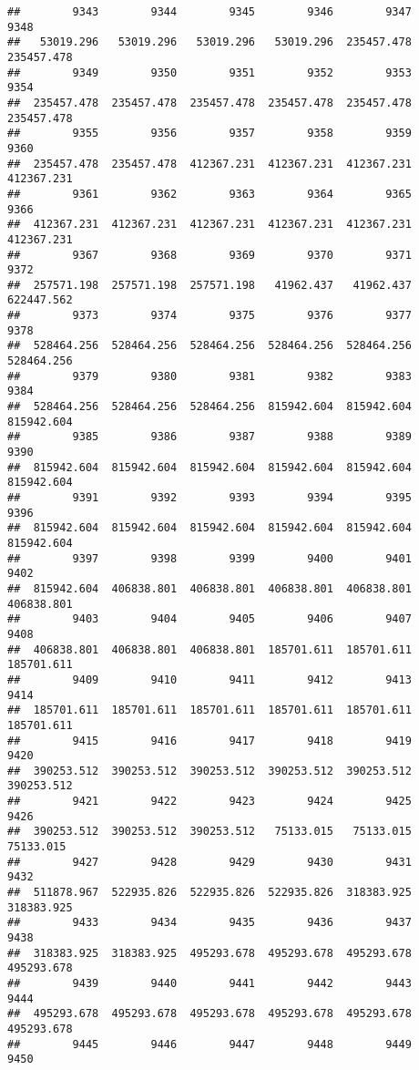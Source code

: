\documentclass[
]{book}
\begin{document}
\begin{verbatim}
##        9343        9344        9345        9346        9347        9348 
##   53019.296   53019.296   53019.296   53019.296  235457.478  235457.478 
##        9349        9350        9351        9352        9353        9354 
##  235457.478  235457.478  235457.478  235457.478  235457.478  235457.478 
##        9355        9356        9357        9358        9359        9360 
##  235457.478  235457.478  412367.231  412367.231  412367.231  412367.231 
##        9361        9362        9363        9364        9365        9366 
##  412367.231  412367.231  412367.231  412367.231  412367.231  412367.231 
##        9367        9368        9369        9370        9371        9372 
##  257571.198  257571.198  257571.198   41962.437   41962.437  622447.562 
##        9373        9374        9375        9376        9377        9378 
##  528464.256  528464.256  528464.256  528464.256  528464.256  528464.256 
##        9379        9380        9381        9382        9383        9384 
##  528464.256  528464.256  528464.256  815942.604  815942.604  815942.604 
##        9385        9386        9387        9388        9389        9390 
##  815942.604  815942.604  815942.604  815942.604  815942.604  815942.604 
##        9391        9392        9393        9394        9395        9396 
##  815942.604  815942.604  815942.604  815942.604  815942.604  815942.604 
##        9397        9398        9399        9400        9401        9402 
##  815942.604  406838.801  406838.801  406838.801  406838.801  406838.801 
##        9403        9404        9405        9406        9407        9408 
##  406838.801  406838.801  406838.801  185701.611  185701.611  185701.611 
##        9409        9410        9411        9412        9413        9414 
##  185701.611  185701.611  185701.611  185701.611  185701.611  185701.611 
##        9415        9416        9417        9418        9419        9420 
##  390253.512  390253.512  390253.512  390253.512  390253.512  390253.512 
##        9421        9422        9423        9424        9425        9426 
##  390253.512  390253.512  390253.512   75133.015   75133.015   75133.015 
##        9427        9428        9429        9430        9431        9432 
##  511878.967  522935.826  522935.826  522935.826  318383.925  318383.925 
##        9433        9434        9435        9436        9437        9438 
##  318383.925  318383.925  495293.678  495293.678  495293.678  495293.678 
##        9439        9440        9441        9442        9443        9444 
##  495293.678  495293.678  495293.678  495293.678  495293.678  495293.678 
##        9445        9446        9447        9448        9449        9450 

\end{verbatim}
\end{document}
